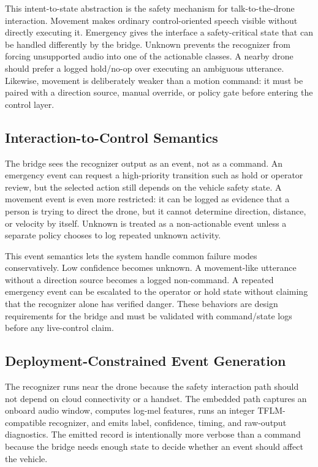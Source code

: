 This intent-to-state abstraction is the safety mechanism for talk-to-the-drone interaction. Movement makes ordinary control-oriented speech visible without directly executing it. Emergency gives the interface a safety-critical state that can be handled differently by the bridge. Unknown prevents the recognizer from forcing unsupported audio into one of the actionable classes. A nearby drone should prefer a logged hold/no-op over executing an ambiguous utterance. Likewise, movement is deliberately weaker than a motion command: it must be paired with a direction source, manual override, or policy gate before entering the control layer.

\subsection{Interaction-to-Control Semantics}

The bridge sees the recognizer output as an event, not as a command. An emergency event can request a high-priority transition such as hold or operator review, but the selected action still depends on the vehicle safety state. A movement event is even more restricted: it can be logged as evidence that a person is trying to direct the drone, but it cannot determine direction, distance, or velocity by itself. Unknown is treated as a non-actionable event unless a separate policy chooses to log repeated unknown activity.

This event semantics lets the system handle common failure modes conservatively. Low confidence becomes unknown. A movement-like utterance without a direction source becomes a logged non-command. A repeated emergency event can be escalated to the operator or hold state without claiming that the recognizer alone has verified danger. These behaviors are design requirements for the bridge and must be validated with command/state logs before any live-control claim.

\subsection{Deployment-Constrained Event Generation}

The recognizer runs near the drone because the safety interaction path should not depend on cloud connectivity or a handset. The embedded path captures an onboard audio window, computes log-mel features, runs an integer TFLM-compatible recognizer, and emits label, confidence, timing, and raw-output diagnostics. The emitted record is intentionally more verbose than a command because the bridge needs enough state to decide whether an event should affect the vehicle.

